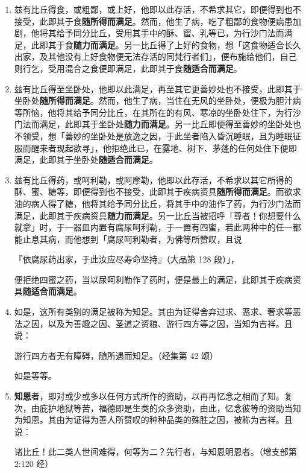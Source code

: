 \begin{enumerate}
\item 兹有比丘得食，或粗鄙，或上好，他即以此存活，不希求其它，即便得到也不接受，此即其于食\textbf{随所得而满足}。然而，他生了病，吃了粗鄙的食物便病患加剧，他将其给予同分比丘，受用其手中的酥、蜜、乳等已，为行沙门法而满足，此即其于食\textbf{随力而满足}。另一比丘得了上好的食物，想「这食物适合长久出家，及其他没有上好食物便无法存活的同梵行者们」，便布施给他们，自己则行乞，受用混合之食便即满足，此即其于食\textbf{随适合而满足}。
\item 兹有比丘得至坐卧处，他即以此满足，再至其它更善妙处也不接受，此即其于坐卧处\textbf{随所得而满足}。然而，他生了病，当住在无风的坐卧处，便极为胆汁病等所恼，他将其给予同分比丘，在其所在的有风、寒凉的坐卧处住下，为行沙门法而满足，此即其于坐卧处\textbf{随力而满足}。另一比丘即便得至善妙的坐卧处也不领受，想「善妙的坐卧处是放逸之因，于此坐者陷入昏沉睡眠，且为睡眠征服而醒来者现起欲寻」，他拒绝此已，在露地、树下、茅蓬的任何处住下便即满足，此即其于坐卧处\textbf{随适合而满足}。
\item 兹有比丘得药，或呵利勒，或阿摩勒，他即以此存活，不希求以其它所得的酥、蜜、糖等，即便得到也不接受，此即其于疾病资具\textbf{随所得而满足}。而欲求油的病人得了糖，他将其给予同分比丘，将其手中的油作了药，为行沙门法而满足，此即其于疾病资具\textbf{随力而满足}。另一比丘当被招呼「尊者！你想要什么就拿」时，于一器皿内置有腐尿呵利勒，于一置有四蜜，若此两种中的任一都能止息其病，而他想到「腐尿呵利勒者，为佛等所赞叹，且说\begin{quoting}『依腐尿药出家，于此汝应尽寿命坚持』（大品第 128 段）」，\end{quoting}便拒绝四蜜之药，当以尿呵利勒作了药时，便是最上的满足，此即其于疾病资具\textbf{随适合而满足}。
\item 如是，这所有类别的满足被称为知足。其由为证得舍弃过求、恶求、奢求等恶法之因，以及为善趣之因、圣道之资粮、游行四方等之因，当知为吉祥。且说：\begin{quoting}游行四方者无有障碍，随所遇而知足。（经集第 42 颂）\end{quoting}如是等等。
\item \textbf{知恩}者，即对或少或多以任何方式所作的资助，以再再忆念之相而了知。复次，由庇护地狱等苦，福德即是生类的众多资助，由此，忆念彼等的资助当知为知恩。其由为证得为善人所赞叹的种种品类的殊胜之因，被称为吉祥。且说：\begin{quoting}诸比丘！此二类人世间难得，何等为二？先行者，与知恩明恩者。（增支部第 2:120 经）\end{quoting}

\end{enumerate}
